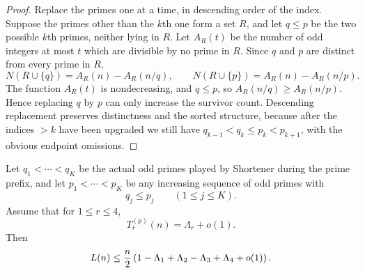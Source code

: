 \begin{proof}
Replace the primes one at a time, in descending order of the index.  Suppose
the primes other than the $k$th one form a set $R$, and let $q\le p$ be the
two possible $k$th primes, neither lying in $R$.  Let $A_R(t)$ be the number
of odd integers at most $t$ which are divisible by no prime in $R$.  Since $q$
and $p$ are distinct from every prime in $R$,
\[
  N(R\cup\{q\})=A_R(n)-A_R(n/q),
  \qquad
  N(R\cup\{p\})=A_R(n)-A_R(n/p).
\]
The function $A_R(t)$ is nondecreasing, and $q\le p$, so
$A_R(n/q)\ge A_R(n/p)$.  Hence replacing $q$ by $p$ can only increase the
survivor count.  Descending replacement preserves distinctness and the sorted
structure, because after the indices $>k$ have been upgraded we still have
$q_{k-1}<q_k\le p_k<p_{k+1}$, with the obvious endpoint omissions.
\end{proof}

\begin{theorem}\label{thm:bonf-comp}
Let $q_1<\cdots<q_K$ be the actual odd primes played by Shortener during the
prime prefix, and let $p_1<\cdots<p_K$ be any increasing sequence of odd
primes with
\[
  q_j \le p_j \qquad (1\le j\le K).
\]
Assume that for $1\le r\le 4$,
\[
  T_r^{(p)}(n) = \Lambda_r + o(1).
\]
Then
\[
  L(n)
  \le
  \frac n2\left(1-\Lambda_1+\Lambda_2-\Lambda_3+\Lambda_4+o(1)\right).
\]
\end{theorem}

